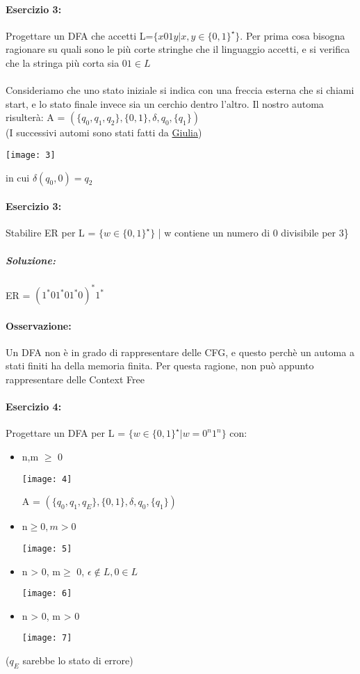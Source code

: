 \documentclass[12pt, a4paper, openany, oneside]{book}
\begin{document}
\paragraph{Esercizio 3: } Progettare un DFA che accetti 
L=$\{x01y|x, y\in\{0,1\}^{\star}\}$. Per prima cosa bisogna ragionare su quali
sono le più corte stringhe che il linguaggio accetti, e si verifica che la
stringa più corta sia $01 \in L$\\ \\
Consideriamo che uno stato iniziale si indica con una freccia esterna che si 
chiami start, e lo stato finale invece sia un cerchio dentro l'altro.
Il nostro automa risulterà: A = $(\{q_{0}, q_{1}, q_{2}\},\{0, 1\},\delta,q_{0},\{q_{1}\})$\\
(I successivi automi sono stati fatti da \href{https://github.com/LiaBell47}{Giulia})
\begin{center}
\texttt{[image: 3]}
\end{center}
in cui $\delta(q_{0},0)=q_{2}$
\paragraph{Esercizio 3:} Stabilire ER per L = $\{w \in \{0, 1\}^{\star}\}$ | w
contiene un numero di 0 divisibile per 3\}
\subparagraph{Soluzione: } ER = $(1^{*}01^{*}01^{*}0)^{*}1^{*}$
\paragraph{Osservazione: } Un DFA non è in grado di rappresentare delle CFG, e 
questo perchè un automa a stati finiti ha della memoria finita. Per questa 
ragione, non può appunto rappresentare delle Context Free
\paragraph{Esercizio 4: } Progettare un DFA per L = $\{w\in\{0,1\}^{\star} | w = 0^{n}1^{n}\}$ con:
\begin{itemize}
	\item n,m $\geq$ 0
	\begin{center}
	\texttt{[image: 4]}
	\end{center}
	A = $(\{q_{0}, q_{1}, q_{E}\},\{0, 1\},\delta,q_{0},\{q_{1}\})$
	\item n$\geq 0, m>0$
	\begin{center}
	\texttt{[image: 5]}
	\end{center}
	\item n > 0, m$\geq$ 0, $\epsilon \notin L, 0 \in L$
	\begin{center}
	\texttt{[image: 6]}
	\end{center}
	\item n > 0, m > 0
	\begin{center}
	\texttt{[image: 7]}
	\end{center}
\end{itemize}
($q_{E}$ sarebbe lo stato di errore)
\end{document}
